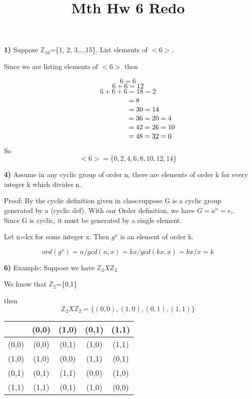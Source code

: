 \documentclass{article}
\title{Mth Hw 6 Redo}
\date{}
\begin{document}
\maketitle


\textbf{1)} Suppose $\mathbb{Z}_{16}$=\{1, 2, 3,...15\}. List elements of $<6>$.

\medskip
Since we are listing elements of $<6>$
then  

$$6=6$$
$$6+6=12$$
$$6+6+6=18=2$$
$$\hspace{.25in} =8$$
$$\hspace{.65in} =30=14$$
$$\hspace{.9in} =36=20=4$$
$$\hspace{.97in} =42=26=10$$
$$\hspace{.9in} =48=32=0$$



So 
$$<6>=\{0, 2, 4, 6, 8, 10, 12, 14\}$$


\newpage

\textbf{4)} Assume in any cyclic group of order n, there are elements of order k for every integer k which divides n. 

\medskip

Proof: By the cyclic definition given in class:suppose G is a cyclic group generated by a (cyclic def). With our Order definition, we have $G=a^{n}=e$,. Since G is cyclic, it must be generated by a single element.

\medskip

Let n=kx for some integer x. Then $g^{x}$ is an element of order k. 

\medskip

$$ord(g^{x})=n/gcd(n,x)=kx/gcd(kx,x)=kx/x=k$$
\medskip

\newpage

\textbf{6)} Example: Suppose we have $\mathbb{Z}_{2}X\mathbb{Z}_{2}$

\medskip

We know that $\mathbb{Z}_{2}$=\{0,1\}

then  $$\mathbb{Z}_{2}X\mathbb{Z}_{2}=\{(0,0),(1,0),(0,1),(1,1)\}$$

\begin{table}[ht]
	\begin{tabular}{|c| |c| |c| |c| |c|}	
	\hline
	& (0,0) & (1,0) &  (0,1)  &(1,1) \\
	\hline
	(0,0) & (0,0) & (0,1) &  (1,0)  &(1,1) \\
	\hline
	(1,0) & (1,0) &(0,0) &(1,1) & (0,1) \\
	\hline
	(0,1) & (0,1) & (1,1) & (0,0) & (1,0) \\
	\hline
	(1,1) & (1,1) & (0,1) & (1,0) & (0,0) 
	\end{tabular}
\end{table}
\end{document}
